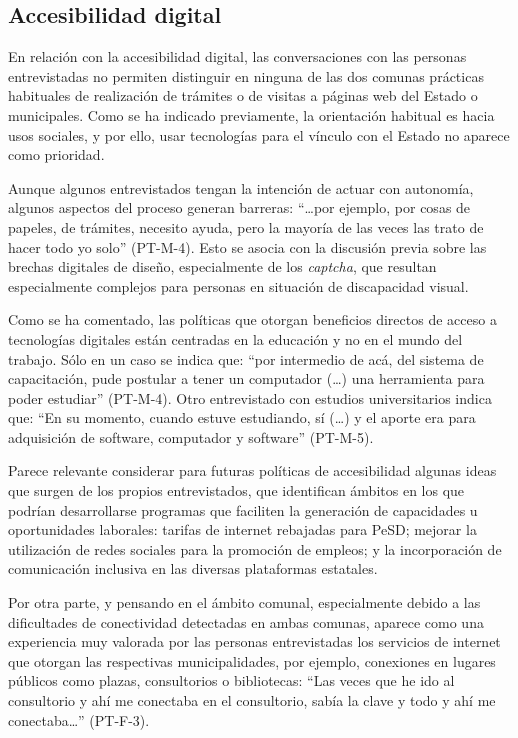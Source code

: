 \subsection{Accesibilidad digital}\label{sub-sec-accesibilidaddigital}

En relación con la accesibilidad digital, las conversaciones con las
personas entrevistadas no permiten distinguir en ninguna de las dos
comunas prácticas habituales de realización de trámites o de visitas a
páginas web del Estado o municipales. Como se ha indicado previamente,
la orientación habitual es hacia usos sociales, y por ello, usar
tecnologías para el vínculo con el Estado no aparece como prioridad.

Aunque algunos entrevistados tengan la intención de actuar con
autonomía, algunos aspectos del proceso generan barreras: \enquote{\ldots por
	ejemplo, por cosas de papeles, de trámites, necesito ayuda, pero la
	mayoría de las veces las trato de hacer todo yo solo} (PT-M-4). Esto se
asocia con la discusión previa sobre las brechas digitales de diseño,
especialmente de los \emph{captcha}, que resultan especialmente
complejos para personas en situación de discapacidad visual.

Como se ha comentado, las políticas que otorgan beneficios directos de
acceso a tecnologías digitales están centradas en la educación y no en
el mundo del trabajo. Sólo en un caso se indica que: \enquote{por intermedio de
	acá, del sistema de capacitación, pude postular a tener un computador
	(\ldots) una herramienta para poder estudiar} (PT-M-4). Otro
entrevistado con estudios universitarios indica que: \enquote{En su momento,
	cuando estuve estudiando, sí (\ldots) y el aporte era para adquisición
	de software, computador y software} (PT-M-5).

Parece relevante considerar para futuras políticas de accesibilidad
algunas ideas que surgen de los propios entrevistados, que identifican
ámbitos en los que podrían desarrollarse programas que faciliten la
generación de capacidades u oportunidades laborales: tarifas de internet
rebajadas para PeSD; mejorar la utilización de redes sociales para la
promoción de empleos; y la incorporación de comunicación inclusiva en
las diversas plataformas estatales.

Por otra parte, y pensando en el ámbito comunal, especialmente debido a
las dificultades de conectividad detectadas en ambas comunas, aparece
como una experiencia muy valorada por las personas entrevistadas los
servicios de internet que otorgan las respectivas municipalidades, por
ejemplo, conexiones en lugares públicos como plazas, consultorios o
bibliotecas: \enquote{Las veces que he ido al consultorio y ahí me conectaba en
	el consultorio, sabía la clave y todo y ahí me conectaba\ldots} (PT-F-3).

